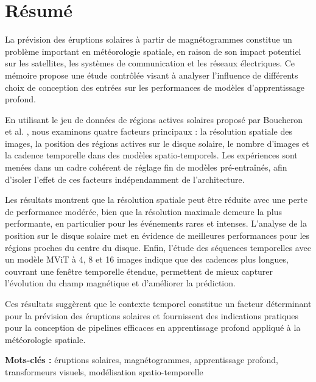 \documentclass[12pt,twoside,maitrise]{dms}
\newenvironment{notocentry}{%
  \let\savedaddcontentsline\addcontentsline
  \renewcommand{\addcontentsline}[3]{}%
}{%
  \let\addcontentsline\savedaddcontentsline
}
\numberwithin{equation}{section}
\numberwithin{table}{chapter}
\numberwithin{figure}{chapter}
\begin{document}
\francais
\begin{notocentry}
\chapter*{Résumé}

La prévision des éruptions solaires à partir de magnétogrammes constitue un problème important en météorologie spatiale, en raison de son impact potentiel sur les satellites, les systèmes de communication et les réseaux électriques. Ce mémoire propose une étude contrôlée visant à analyser l’influence de différents choix de conception des entrées sur les performances de modèles d’apprentissage profond.

En utilisant le jeu de données de régions actives solaires proposé par Boucheron et al. \cite{ref_boucheron}, nous examinons quatre facteurs principaux : la résolution spatiale des images, la position des régions actives sur le disque solaire, le nombre d'images et la cadence temporelle dans des modèles spatio-temporels. Les expériences sont menées dans un cadre cohérent de réglage fin de modèles pré-entraînés, afin d’isoler l’effet de ces facteurs indépendamment de l’architecture.

Les résultats montrent que la résolution spatiale peut être réduite avec une perte de performance modérée, bien que la résolution maximale demeure la plus performante, en particulier pour les événements rares et intenses. L’analyse de la position sur le disque solaire met en évidence de meilleures performances pour les régions proches du centre du disque. Enfin, l’étude des séquences temporelles avec un modèle MViT à 4, 8 et 16 images indique que des cadences plus longues, couvrant une fenêtre temporelle étendue, permettent de mieux capturer l’évolution du champ magnétique et d’améliorer la prédiction.

Ces résultats suggèrent que le contexte temporel constitue un facteur déterminant pour la prévision des éruptions solaires et fournissent des indications pratiques pour la conception de pipelines efficaces en apprentissage profond appliqué à la météorologie spatiale.

\textbf{Mots-clés :} éruptions solaires, magnétogrammes, apprentissage profond, transformeurs visuels, modélisation spatio-temporelle
\end{notocentry}
 
\end{document}
